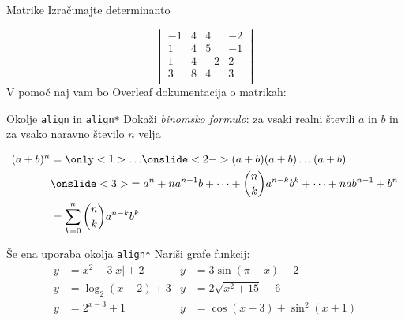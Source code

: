 \begin{frame}{Matrike}
	Izračunajte determinanto

		 $$
		 \begin{vmatrix}
			-1 & 4 & 4 & -2 \\
			 1 & 4 & 5 & -1 \\
			 1 & 4 & -2 & 2 \\
			 3 & 8 & 4 & 3 \\
		 \end{vmatrix}
		 $$
	V pomoč naj vam bo Overleaf dokumentacija o matrikah:
	
	\href{https://www.overleaf.com/learn/latex/Matrices}{}
\end{frame}

\begin{frame}{Okolje \texttt{align} in \texttt{align*}}
	Dokaži \emph{binomsko formulo}: za vsaki realni števili $a$ in $b$ in za vsako naravno število $n$ velja
	
	\begin{align*}
		(a+b)^n &= \only<1>{\ldots}
		\onslide<2->{(a+b) (a+b) \dots (a+b)}\\
		&\onslide<3>{= a^n + n a^{n-1} b + \dots + \binom{n}{k} a^{n-k} b^k + \dots + n a b^{n-1} + b^n}\\
		&= \sum_{k=0}^n \binom{n}{k} a^{n-k} b^k
	\end{align*}
\end{frame}

\begin{frame}{Še ena uporaba okolja \texttt{align*}}
	Nariši grafe funkcij:
	\begin{align*}
	y& = x^2 - 3|x| + 2  &   y& = 3 \sin(\pi+x) - 2\\ 
	y& = \log_2(x-2) + 3 &   y& = 2 \sqrt{x^2+15} + 6\\
	y& = 2^{x-3} + 1     &   y& = \cos(x-3) + \sin^2(x+1)\\
	\end{align*}
	 
	
\end{frame}

